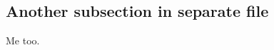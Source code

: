 \subsection{Another subsection in separate file}
\label{sec:sub2}
\begin{info}
	Me too.
\end{info}



